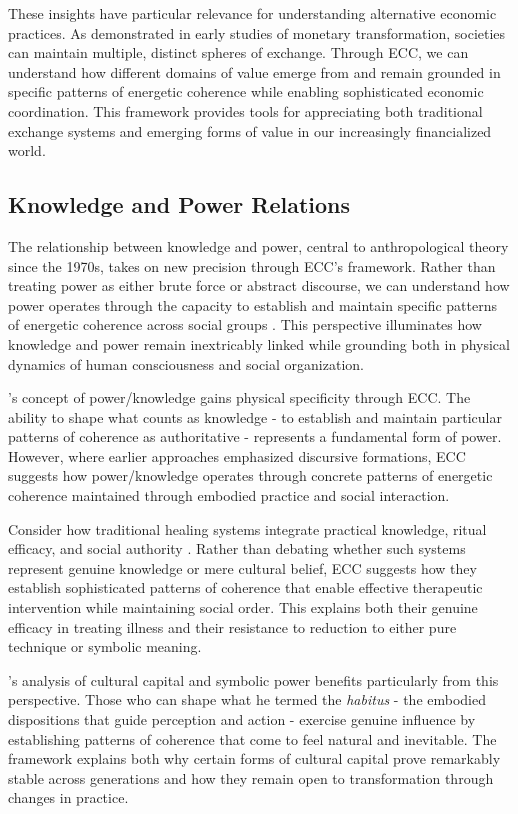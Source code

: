 \begin{refsection}
These insights have particular relevance for understanding alternative economic practices. As \cite{bohannan1959impact} demonstrated in early studies of monetary transformation, societies can maintain multiple, distinct spheres of exchange. Through ECC, we can understand how different domains of value emerge from and remain grounded in specific patterns of energetic coherence while enabling sophisticated economic coordination. This framework provides tools for appreciating both traditional exchange systems and emerging forms of value in our increasingly financialized world.

\subsection{Knowledge and Power Relations}

The relationship between knowledge and power, central to anthropological theory since the 1970s, takes on new precision through ECC's framework. Rather than treating power as either brute force or abstract discourse, we can understand how power operates through the capacity to establish and maintain specific patterns of energetic coherence across social groups \cite{foucault1980power}. This perspective illuminates how knowledge and power remain inextricably linked while grounding both in physical dynamics of human consciousness and social organization.

\cite{foucault1980power}'s concept of power/knowledge gains physical specificity through ECC. The ability to shape what counts as knowledge - to establish and maintain particular patterns of coherence as authoritative - represents a fundamental form of power. However, where earlier approaches emphasized discursive formations, ECC suggests how power/knowledge operates through concrete patterns of energetic coherence maintained through embodied practice and social interaction.

Consider how traditional healing systems integrate practical knowledge, ritual efficacy, and social authority \cite{scott1990domination}. Rather than debating whether such systems represent genuine knowledge or mere cultural belief, ECC suggests how they establish sophisticated patterns of coherence that enable effective therapeutic intervention while maintaining social order. This explains both their genuine efficacy in treating illness and their resistance to reduction to either pure technique or symbolic meaning.

\cite{bourdieu1977outline}'s analysis of cultural capital and symbolic power benefits particularly from this perspective. Those who can shape what he termed the \textit{habitus} - the embodied dispositions that guide perception and action - exercise genuine influence by establishing patterns of coherence that come to feel natural and inevitable. The framework explains both why certain forms of cultural capital prove remarkably stable across generations and how they remain open to transformation through changes in practice.


\end{refsection}
